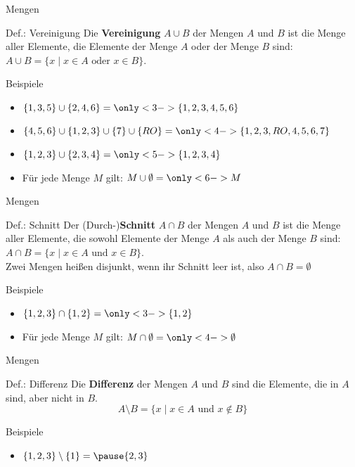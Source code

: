 	\begin{frame}{Mengen}
		\begin{block}{Def.: Vereinigung}
			Die \textbf{Vereinigung} $A \cup B$ der Mengen $A$ und $B$ ist die Menge aller Elemente, die Elemente der Menge $A$ oder der Menge $B$ sind: $A \cup B = \{x \mid x \in A \text{ oder } x \in B\}$.
		\end{block}
		\pause
		\begin{exampleblock}{Beispiele}
			\begin{itemize}
				\item $\{1,3,5\}\cup\{2,4,6\} = \only<3->{\{1,2,3,4,5,6\}}$
				\item $\{4,5,6\}\cup\{1,2,3\}\cup\{7\}\cup\{RO\} = \only<4->{\{1,2,3,RO,4,5,6,7\}}$
				\item $\{1,2,3\}\cup\{2,3,4\} = \only<5->{\{1,2,3,4\}}$
				\item Für jede Menge $M$ gilt: $M \cup \emptyset = \only<6->{M}$
			\end{itemize}
		\end{exampleblock}
	\end{frame}

	\begin{frame}{Mengen}
		\begin{block}{Def.: Schnitt}
			Der (Durch-)\textbf{Schnitt} $A \cap B$ der Mengen $A$ und $B$ ist die Menge aller Elemente, die sowohl Elemente der Menge $A$ als auch der Menge $B$ sind: $A \cap B = \{x \mid x \in A \text{ und } x \in B\}$.\\
			Zwei Mengen heißen disjunkt, wenn ihr Schnitt leer ist, also $A \cap B = \emptyset$
		\end{block}
		\pause
		\begin{exampleblock}{Beispiele}
			\begin{itemize}
				\item $\{1,2,3\}\cap\{1,2\} = \only<3->{\{1,2\}}$
				\item Für jede Menge $M$ gilt: $M \cap \emptyset = \only<4->{\emptyset}$
			\end{itemize}
		\end{exampleblock}
	\end{frame}	

	\begin{frame}{Mengen}
		\begin{block}{Def.: Differenz}
			Die \textbf{Differenz} der Mengen $A$ und $B$ sind die Elemente, die in $A$ sind, aber nicht in $B$.
			$$A \setminus B = \{x \mid x \in A \text{ und } x \notin B\}$$
		\end{block}		
		\pause
		\begin{exampleblock}{Beispiele}
			\begin{itemize}
				\item $\set{1,2,3}\setminus\set{1} = \pause \set{2,3}$
			\end{itemize}
		\end{exampleblock}
	\end{frame}

